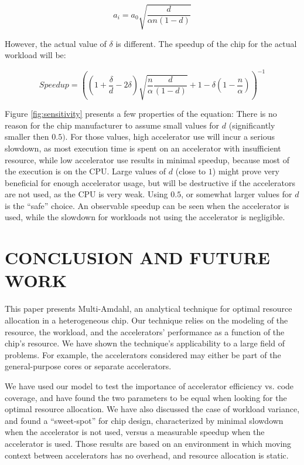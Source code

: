 \documentclass[twocolumn,english]{IEEEtran}
\begin{document}
\[
a_{i}=a_{0}\sqrt{\frac{d}{\alpha n(1-d)}}\]


However, the actual value of $\delta$ is different. The speedup of
the chip for the actual workload will be:

\[
Speedup=\left(\left(1+\frac{\delta}{d}-2\delta\right)\sqrt{\frac{n}{\alpha}\frac{d}{(1-d)}}+1-\delta\left(1-\frac{n}{\alpha}\right)\right)^{-1}\]


Figure \ref{fig:sensitivity} presents a few properties of the equation:
There is no reason for the chip manufacturer to assume small values
for $d$ (significantly smaller then $0.5\mbox{)}$. For those values,
high accelerator use will incur a serious slowdown, as most execution
time is spent on an accelerator with insufficient resource, while
low accelerator use results in minimal speedup, because most of the
execution is on the CPU. Large values of $d$ (close to $1$) might
prove very beneficial for enough accelerator usage, but will be destructive
if the accelerators are not used, as the CPU is very weak. Using $0.5$,
or somewhat larger values for $d$ is the {}``safe'' choice. An
observable speedup can be seen when the accelerator is used, while
the slowdown for workloads not using the accelerator is negligible. 

\textbf{}




\section{CONCLUSION AND FUTURE WORK }

This paper presents Multi-Amdahl, an analytical technique for optimal
resource allocation in a heterogeneous chip. Our technique relies
on the modeling of the resource, the workload, and the accelerators\textquoteright{}
performance as a function of the chip\textquoteright{}s resource.
We have shown the technique's applicability to a large field of problems.
For example, the accelerators considered may either be part of the
general-purpose cores or separate accelerators. 

We have used our model to test the importance of accelerator efficiency
vs. code coverage, and have found the two parameters to be equal when
looking for the optimal resource allocation. We have also discussed
the case of workload variance, and found a {}``sweet-spot'' for
chip design, characterized by minimal slowdown when the accelerator
is not used, versus a measurable speedup when the accelerator is used.
Those results are based on an environment in which moving context
between accelerators has no overhead, and resource allocation is static. 
\end{document}
